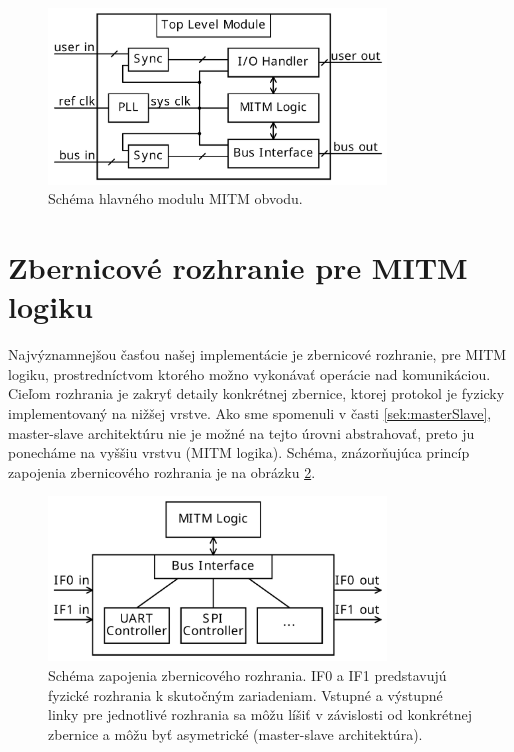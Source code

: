 \begin{figure}
    \centerline{\includegraphics[width=0.8\textwidth]{images/topLevelModule.pdf}}
    \caption[Schéma hlavného modulu MITM obvodu]{Schéma hlavného modulu MITM obvodu.}
    \label{obr:topLevelModule}
\end{figure}

\section{Zbernicové rozhranie pre MITM logiku}
Najvýznamnejšou časťou našej implementácie je zbernicové rozhranie, pre MITM logiku, prostredníctvom ktorého možno vykonávať operácie nad komunikáciou. Cieľom rozhrania je zakryť detaily konkrétnej zbernice, ktorej protokol je fyzicky implementovaný na nižšej vrstve. Ako sme spomenuli v časti \ref{sek:masterSlave}, master-slave architektúru nie je možné na tejto úrovni abstrahovať, preto ju ponecháme na vyššiu vrstvu (MITM logika). Schéma, znázorňujúca princíp zapojenia zbernicového rozhrania je na obrázku \ref{obr:busInterface}.

\begin{figure}
    \centerline{\includegraphics[width=0.8\textwidth]{images/busInterface.pdf}}
    \caption[Schéma zapojenia zbernicového rozhrania]{Schéma zapojenia zbernicového rozhrania. IF0 a IF1 predstavujú fyzické rozhrania k skutočným zariadeniam. Vstupné a výstupné linky pre jednotlivé rozhrania sa môžu líšiť v závislosti od konkrétnej zbernice a môžu byť asymetrické (master-slave architektúra).}
    \label{obr:busInterface}
\end{figure}

